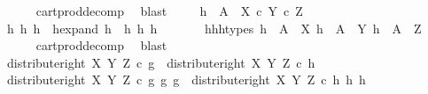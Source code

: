 \begin{isabellebody}
\ \ \ \ \isamarkupfalse%
\ cart{\isacharunderscore}{\kern0pt}prod{\isacharunderscore}{\kern0pt}decomp\ \isamarkupfalse%
\ blast\ \isanewline
\ \ \isamarkupfalse%
\ {\isachardoublequoteopen}h\ {\isacharcolon}{\kern0pt}\ A\ {\isasymrightarrow}\ {\isacharparenleft}{\kern0pt}X\ {\isasymtimes}\isactrlsub c\ Y{\isacharparenright}{\kern0pt}\ {\isasymtimes}\isactrlsub c\ Z{\isachardoublequoteclose}\isanewline
\ \ \isamarkupfalse%
\ \isamarkupfalse%
\ h{}\ h{}\ h{}\ \ h{\isacharunderscore}{\kern0pt}expand{\isacharcolon}{\kern0pt}\ {\isachardoublequoteopen}h\ {\isacharequal}{\kern0pt}\ {\isasymlangle}{\isasymlangle}h{}{\isacharcomma}{\kern0pt}\ h{}{\isasymrangle}{\isacharcomma}{\kern0pt}\ h{}{\isasymrangle}{\isachardoublequoteclose}\isanewline
\ \ \ \ \ \ \ h{}{\isacharunderscore}{\kern0pt}h{}{\isacharunderscore}{\kern0pt}h{}{\isacharunderscore}{\kern0pt}types{\isacharcolon}{\kern0pt}\ {\isachardoublequoteopen}h{}\ {\isacharcolon}{\kern0pt}\ A\ {\isasymrightarrow}\ X{\isachardoublequoteclose}\ {\isachardoublequoteopen}h{}\ {\isacharcolon}{\kern0pt}\ A\ {\isasymrightarrow}\ Y{\isachardoublequoteclose}\ {\isachardoublequoteopen}h{}\ {\isacharcolon}{\kern0pt}\ A\ {\isasymrightarrow}\ Z{\isachardoublequoteclose}\isanewline
\ \ \ \ \isamarkupfalse%
\ cart{\isacharunderscore}{\kern0pt}prod{\isacharunderscore}{\kern0pt}decomp\ \isamarkupfalse%
\ blast\ \isanewline
\isanewline
\ \ \isamarkupfalse%
\ {\isachardoublequoteopen}distribute{\isacharunderscore}{\kern0pt}right\ X\ Y\ Z\ {\isasymcirc}\isactrlsub c\ g\ {\isacharequal}{\kern0pt}\ distribute{\isacharunderscore}{\kern0pt}right\ X\ Y\ Z\ {\isasymcirc}\isactrlsub c\ h{\isachardoublequoteclose}\isanewline
\ \ \isamarkupfalse%
\ \isamarkupfalse%
\ {\isachardoublequoteopen}distribute{\isacharunderscore}{\kern0pt}right\ X\ Y\ Z\ {\isasymcirc}\isactrlsub c\ {\isasymlangle}{\isasymlangle}g{}{\isacharcomma}{\kern0pt}\ g{}{\isasymrangle}{\isacharcomma}{\kern0pt}\ g{}{\isasymrangle}\ {\isacharequal}{\kern0pt}\ distribute{\isacharunderscore}{\kern0pt}right\ X\ Y\ Z\ {\isasymcirc}\isactrlsub c\ {\isasymlangle}{\isasymlangle}h{}{\isacharcomma}{\kern0pt}\ h{}{\isasymrangle}{\isacharcomma}{\kern0pt}\ h{}{\isasymrangle}{\isachardoublequoteclose}\isanewline

\end{isabellebody}
